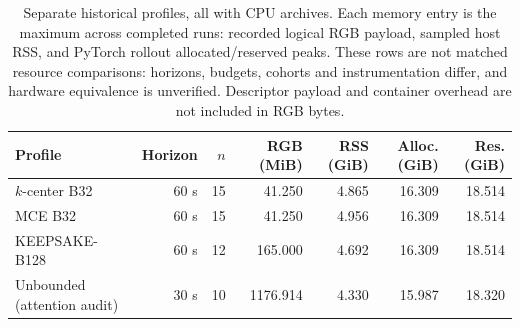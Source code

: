 \begin{table}[ht]
\centering
\small
\begin{tabular}{lrrrrrr}
\toprule
Profile & Horizon & $n$ & RGB (MiB) & RSS (GiB) & Alloc. (GiB) & Res. (GiB) \\
\midrule
$k$-center B32 & 60 s & 15 & 41.250 & 4.865 & 16.309 & 18.514 \\
MCE B32 & 60 s & 15 & 41.250 & 4.956 & 16.309 & 18.514 \\
KEEPSAKE-B128 & 60 s & 12 & 165.000 & 4.692 & 16.309 & 18.514 \\
Unbounded (attention audit) & 30 s & 10 & 1176.914 & 4.330 & 15.987 & 18.320 \\
\bottomrule
\end{tabular}
\caption{Separate historical profiles, all with CPU archives. Each memory entry is the maximum across completed runs: recorded logical RGB payload, sampled host RSS, and PyTorch rollout allocated/reserved peaks. These rows are not matched resource comparisons: horizons, budgets, cohorts and instrumentation differ, and hardware equivalence is unverified. Descriptor payload and container overhead are not included in RGB bytes.}
\label{tab:historical-profiles}
\end{table}
